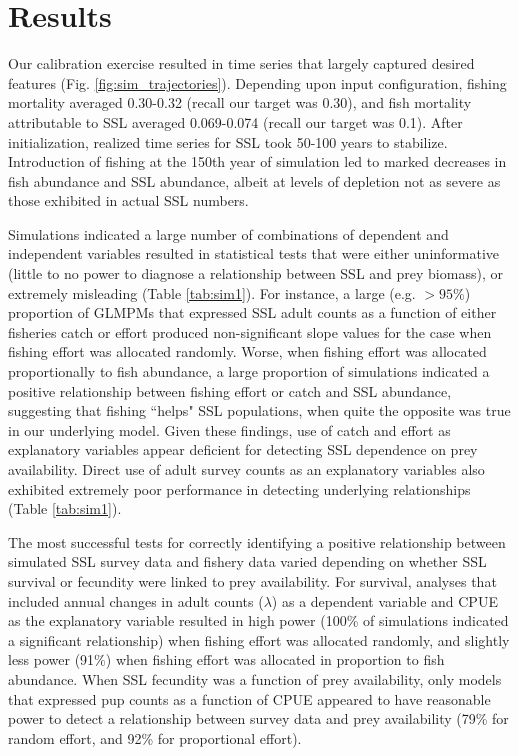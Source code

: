 \documentclass[nonumbib,leqno]{nrc1}
\begin{document}
\section{Results}

Our calibration exercise resulted in time series that largely captured desired features (Fig. \ref{fig:sim_trajectories}).  Depending upon input configuration, fishing mortality averaged 0.30-0.32 (recall our target was 0.30), and fish mortality attributable to SSL averaged 0.069-0.074 (recall our target was 0.1).  After initialization, realized time series for SSL took 50-100 years to stabilize.  Introduction of fishing at the 150th year of simulation led to marked decreases in fish abundance and SSL abundance, albeit at levels of depletion not as severe as those exhibited in actual SSL numbers.

Simulations indicated a large number of combinations of dependent and independent variables resulted in statistical tests that were either uninformative (little to no power to diagnose a relationship between SSL and prey biomass), or extremely misleading (Table \ref{tab:sim1}).  For instance, a large (e.g. $>95\%$) proportion of GLMPMs that expressed SSL adult counts as a function of either fisheries catch or effort produced non-significant slope values for the case when fishing effort was allocated randomly.  Worse, when fishing effort was allocated proportionally to fish abundance, a large proportion of simulations indicated a positive relationship between fishing effort or catch and SSL abundance, suggesting that fishing ``helps" SSL populations, when quite the opposite was true in our underlying model.  Given these findings, use of catch and effort as explanatory variables appear deficient for detecting SSL dependence on prey availability.  Direct use of adult survey counts as an explanatory variables also exhibited extremely poor performance in detecting underlying relationships (Table \ref{tab:sim1}).

The most successful tests for correctly identifying a positive relationship between simulated SSL survey data and fishery data varied depending on whether SSL survival or fecundity were linked to prey availability.  For survival, analyses that included annual changes in adult counts ($\lambda$) as a dependent variable and CPUE as the explanatory variable resulted in high power (100\% of simulations indicated a significant relationship) when fishing effort was allocated randomly, and slightly less power (91\%) when fishing effort was allocated in proportion to fish abundance. When SSL fecundity was a function of prey availability, only models that expressed pup counts as a function of CPUE appeared to have reasonable power to detect a relationship between survey data and prey availability (79\% for random effort, and 92\% for proportional effort).
\end{document}
